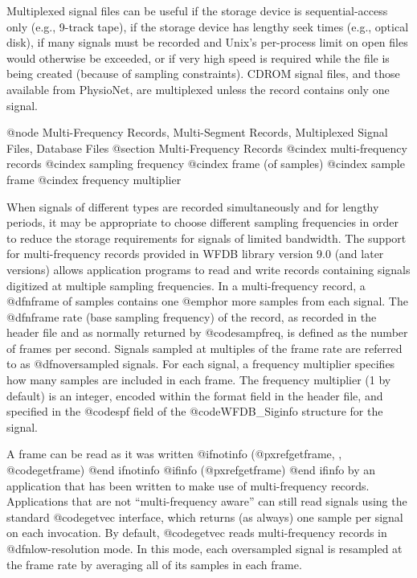 {{{{{{{{{{{{{{Multiplexed signal files can be useful if the storage device is
sequential-access only (e.g., 9-track tape), if the storage device has lengthy
seek times (e.g., optical disk), if many signals must be recorded and Unix's
per-process limit on open files would otherwise be exceeded, or if very high
speed is required while the file is being created (because of sampling
constraints).  CDROM signal files, and those available from PhysioNet, are
multiplexed unless the record contains only one signal.

@node     Multi-Frequency Records, Multi-Segment Records, Multiplexed Signal Files, Database Files
@section Multi-Frequency Records
@cindex multi-frequency records
@cindex sampling frequency
@cindex frame (of samples)
@cindex sample frame
@cindex frequency multiplier

When signals of different types are recorded simultaneously and for
lengthy periods, it may be appropriate to choose different sampling
frequencies in order to reduce the storage requirements for signals of
limited bandwidth.  The support for multi-frequency records provided in
WFDB library version 9.0 (and later versions) allows application programs
to read and write records containing signals digitized at multiple
sampling frequencies.  In a multi-frequency record, a @dfn{frame} of
samples contains one @emph{or more} samples from each signal.  The
@dfn{frame rate} (base sampling frequency) of the record, as recorded in the
header file and as normally returned by @code{sampfreq}, is defined as
the number of frames per second.  Signals sampled at multiples of the
frame rate are referred to as @dfn{oversampled signals}.  For each signal, a
frequency multiplier specifies how many samples are included in each
frame.  The frequency multiplier (1 by default) is an integer, encoded
within the format field in the header file, and specified in the
@code{spf} field of the @code{WFDB_Siginfo} structure for the signal.

A frame can be read as it was written
@ifnotinfo
(@pxref{getframe, , @code{getframe}})
@end ifnotinfo
@ifinfo
(@pxref{getframe})
@end ifinfo
by an application that has been written to make use of multi-frequency
records.  Applications that are not ``multi-frequency aware'' can still
read signals using the standard @code{getvec} interface, which returns
(as always) one sample per signal on each invocation.  By default,
@code{getvec} reads multi-frequency records in @dfn{low-resolution} mode.
In this mode, each oversampled signal is resampled at the frame rate by
averaging all of its samples in each frame.

}}}}}}}}}}}}}}
